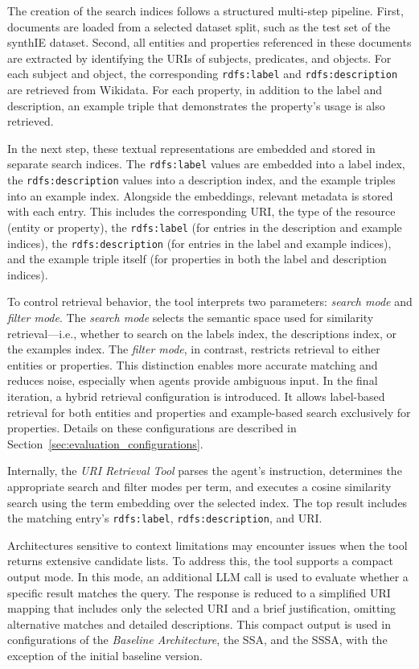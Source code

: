\documentclass[a4paper,oneside,bibliography=totoc]{scrbook}
\begin{document}
The creation of the search indices follows a structured multi-step pipeline. First, documents are loaded from a selected dataset split, such as the test set of the synthIE dataset. Second, all entities and properties referenced in these documents are extracted by identifying the URIs of subjects, predicates, and objects. For each subject and object, the corresponding \texttt{rdfs:label} and \texttt{rdfs:description} are retrieved from Wikidata. For each property, in addition to the label and description, an example triple that demonstrates the property’s usage is also retrieved.

In the next step, these textual representations are embedded and stored in separate search indices. The \texttt{rdfs:label} values are embedded into a label index, the \texttt{rdfs:description} values into a description index, and the example triples into an example index. Alongside the embeddings, relevant metadata is stored with each entry. This includes the corresponding URI, the type of the resource (entity or property), the \texttt{rdfs:label} (for entries in the description and example indices), the \texttt{rdfs:description} (for entries in the label and example indices), and the example triple itself (for properties in both the label and description indices).

To control retrieval behavior, the tool interprets two parameters: \textit{search mode} and \textit{filter mode}. The \textit{search mode} selects the semantic space used for similarity retrieval—i.e., whether to search on the labels index, the descriptions index, or the examples index. The \textit{filter mode}, in contrast, restricts retrieval to either entities or properties. This distinction enables more accurate matching and reduces noise, especially when agents provide ambiguous input. In the final iteration, a hybrid retrieval configuration is introduced. It allows label-based retrieval for both entities and properties and example-based search exclusively for properties. Details on these configurations are described in Section~\ref{sec:evaluation_configurations}.

Internally, the \textit{URI Retrieval Tool} parses the agent’s instruction, determines the appropriate search and filter modes per term, and executes a cosine similarity search using the term embedding over the selected index. The top result includes the matching entry’s \texttt{rdfs:label}, \texttt{rdfs:description}, and URI.

Architectures sensitive to context limitations may encounter issues when the tool returns extensive candidate lists. To address this, the tool supports a compact output mode. In this mode, an additional \ac{LLM} call is used to evaluate whether a specific result matches the query. The response is reduced to a simplified URI mapping that includes only the selected URI and a brief justification, omitting alternative matches and detailed descriptions. This compact output is used in configurations of the \textit{Baseline Architecture}, the \ac{SSA}, and the \ac{SSSA}, with the exception of the initial baseline version.
\end{document}
